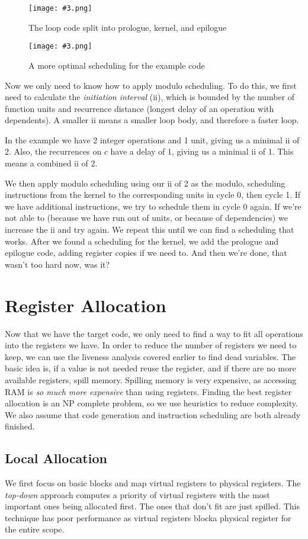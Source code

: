 \documentclass{article}
\newcommand{\fig}[4]{
	\begin{figure}[#1]
		\center
		\texttt{[image: \#3.png]}
		\caption{#4}
		\label{fig:#3}
	\end{figure}
	}
\begin{document}
\fig{h}{0.8}{split}{The loop code split into prologue, kernel, and epilogue}
\fig{h}{0.8}{scheduling}{A more optimal scheduling for the example code}

Now we only need to know how to apply modulo scheduling.
To do this, we first need to calculate the \emph{initiation interval} (ii), which is bounded by the number of function units and recurrence distance (longest delay of an operation with dependents).
A smaller ii means a smaller loop body, and therefore a faster loop.

In the example we have 2 integer operations and 1 unit, giving us a minimal ii of 2.
Also, the recurrences on $c$ have a delay of 1, giving us a minimal ii of 1.
This means a combined ii of 2.

We then apply modulo scheduling using our ii of 2 as the modulo, scheduling instructions from the kernel to the corresponding units in cycle 0, then cycle 1.
If we have additional instructions, we try to schedule them in cycle 0 again.
If we're not able to (because we have run out of units, or because of dependencies) we increase the ii and try again.
We repeat this until we can find a scheduling that works.
After we found a scheduling for the kernel, we add the prologue and epilogue code, adding register copies if we need to.
And then we're done, that wasn't too hard now, was it?

\section{Register Allocation}
Now that we have the target code, we only need to find a way to fit all operations into the registers we have.
In order to reduce the number of registers we need to keep, we can use the liveness analysis covered earlier to find dead variables.
The basic idea is, if a value is not needed reuse the register, and if there are no more available registers, spill memory.
Spilling memory is very expensive, as accessing RAM is \emph{so much more expensive} than using registers.
Finding the best register allocation is an NP complete problem, so we use heuristics to reduce complexity.
We also assume that code generation and instruction scheduling are both already finished.

\subsection{Local Allocation}
We first focus on basic blocks and map virtual registers to physical registers.
The \emph{top-down} approach computes a priority of virtual registers with the most important ones being allocated first.
The ones that don't fit are just spilled.
This technique has poor performance as virtual registers blocka physical register for the entire scope.
\end{document}
